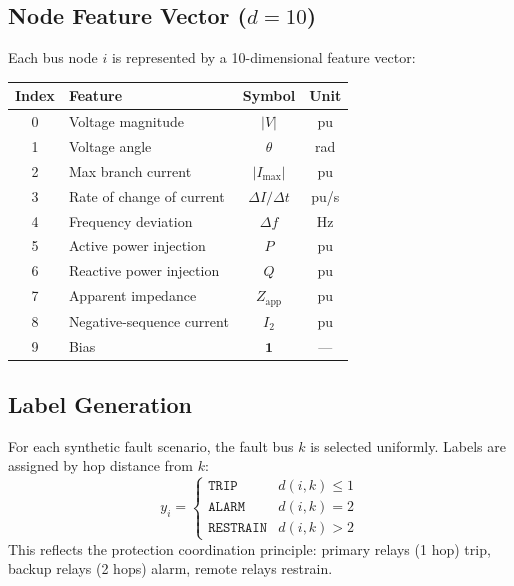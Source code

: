 \documentclass[11pt,a4paper]{article}
\begin{document}
\subsection{Node Feature Vector ($d=10$)}

Each bus node $i$ is represented by a 10-dimensional feature vector:

\begin{center}
\begin{tabular}{clcc}
\toprule
Index & Feature & Symbol & Unit \\
\midrule
0 & Voltage magnitude     & $|V|$          & pu \\
1 & Voltage angle         & $\theta$       & rad \\
2 & Max branch current    & $|I_\text{max}|$ & pu \\
3 & Rate of change of current & $\Delta I/\Delta t$ & pu/s \\
4 & Frequency deviation   & $\Delta f$     & Hz \\
5 & Active power injection & $P$            & pu \\
6 & Reactive power injection & $Q$          & pu \\
7 & Apparent impedance    & $Z_\text{app}$ & pu \\
8 & Negative-sequence current & $I_2$       & pu \\
9 & Bias                  & $\mathbf{1}$   & --- \\
\bottomrule
\end{tabular}
\end{center}

\subsection{Label Generation}

For each synthetic fault scenario, the fault bus $k$ is selected uniformly.
Labels are assigned by hop distance from $k$:
\begin{equation}
  y_i = \begin{cases}
    \texttt{TRIP}     & d(i,k) \le 1 \\
    \texttt{ALARM}    & d(i,k) = 2   \\
    \texttt{RESTRAIN} & d(i,k) > 2
  \end{cases}
  \label{eq:label}
\end{equation}
This reflects the protection coordination principle: primary relays (1 hop)
trip, backup relays (2 hops) alarm, remote relays restrain.
\end{document}
